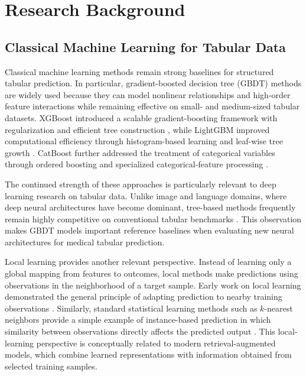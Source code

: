 \documentclass[11pt,a4paper,oneside, openany, reqno, chapter, nokorean]{oblivoir}
\theoremstyle{definition}
\theoremstyle{remark}
\numberwithin{equation}{chapter}
\theoremstyle{definition}
\theoremstyle{remark}
\theoremstyle{definition}
\begin{document}
\chapter{Research Background}
\label{chap:background}

\section{Classical Machine Learning for Tabular Data}

Classical machine learning methods remain strong baselines for structured
tabular prediction. In particular, gradient-boosted decision tree (GBDT)
methods are widely used because they can model nonlinear relationships and
high-order feature interactions while remaining effective on small- and
medium-sized tabular datasets. XGBoost introduced a scalable gradient-boosting
framework with regularization and efficient tree construction
\cite{chen2016xgboost}, while LightGBM improved computational efficiency
through histogram-based learning and leaf-wise tree growth
\cite{ke2017lightgbm}. CatBoost further addressed the treatment of categorical
variables through ordered boosting and specialized categorical-feature
processing \cite{prokhorenkova2018catboost}.

The continued strength of these approaches is particularly relevant to deep
learning research on tabular data. Unlike image and language domains, where
deep neural architectures have become dominant, tree-based methods frequently
remain highly competitive on conventional tabular benchmarks
\cite{grinsztajn2022tree}. This observation makes GBDT models important
reference baselines when evaluating new neural architectures for medical
tabular prediction.

Local learning provides another relevant perspective. Instead of learning only
a global mapping from features to outcomes, local methods make predictions
using observations in the neighborhood of a target sample. Early work on local
learning demonstrated the general principle of adapting prediction to nearby
training observations \cite{bottou1992local}. Similarly, standard statistical
learning methods such as $k$-nearest neighbors provide a simple example of
instance-based prediction in which similarity between observations directly
affects the predicted output \cite{james2013islr}. This local-learning
perspective is conceptually related to modern retrieval-augmented models, which
combine learned representations with information obtained from selected
training samples.
\end{document}
